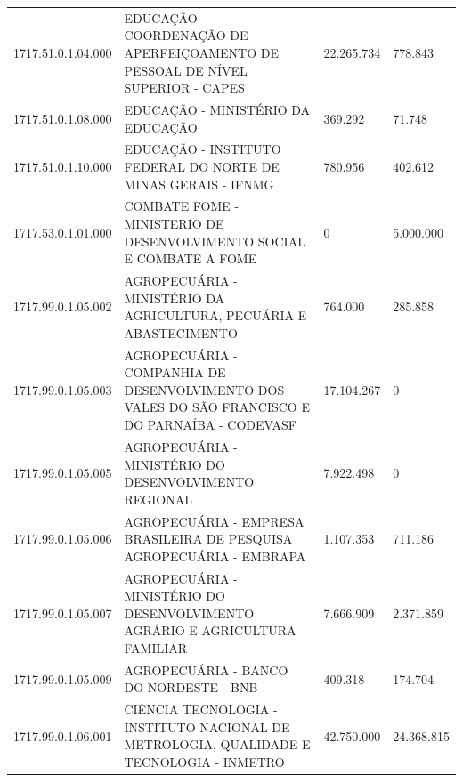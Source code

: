 \documentclass{article}
\begin{document}
\begin{longtable}[c]{m{2cm}|m{11cm}|m{2cm}m{2cm}}
\multicolumn{1}{C{2cm}|}{1717.51.0.1.04.000} & \multicolumn{1}{L{11cm}|}{EDUCAÇÃO - COORDENAÇÃO DE APERFEIÇOAMENTO DE PESSOAL DE NÍVEL SUPERIOR - CAPES} & \multicolumn{1}{R{2cm}|}{22.265.734} & \multicolumn{1}{R{2cm}}{778.843} \\
\multicolumn{1}{C{2cm}|}{1717.51.0.1.08.000} & \multicolumn{1}{L{11cm}|}{EDUCAÇÃO - MINISTÉRIO DA EDUCAÇÃO} & \multicolumn{1}{R{2cm}|}{369.292} & \multicolumn{1}{R{2cm}}{71.748} \\
\multicolumn{1}{C{2cm}|}{1717.51.0.1.10.000} & \multicolumn{1}{L{11cm}|}{EDUCAÇÃO - INSTITUTO FEDERAL DO NORTE DE MINAS GERAIS - IFNMG} & \multicolumn{1}{R{2cm}|}{780.956} & \multicolumn{1}{R{2cm}}{402.612} \\
\multicolumn{1}{C{2cm}|}{1717.53.0.1.01.000} & \multicolumn{1}{L{11cm}|}{COMBATE FOME - MINISTERIO DE DESENVOLVIMENTO SOCIAL E COMBATE A FOME} & \multicolumn{1}{R{2cm}|}{            0} & \multicolumn{1}{R{2cm}}{5.000.000} \\
\multicolumn{1}{C{2cm}|}{1717.99.0.1.05.002} & \multicolumn{1}{L{11cm}|}{AGROPECUÁRIA - MINISTÉRIO DA AGRICULTURA, PECUÁRIA E ABASTECIMENTO} & \multicolumn{1}{R{2cm}|}{764.000} & \multicolumn{1}{R{2cm}}{285.858} \\
\multicolumn{1}{C{2cm}|}{1717.99.0.1.05.003} & \multicolumn{1}{L{11cm}|}{AGROPECUÁRIA - COMPANHIA DE DESENVOLVIMENTO DOS VALES DO SÃO FRANCISCO E DO PARNAÍBA - CODEVASF} & \multicolumn{1}{R{2cm}|}{17.104.267} & \multicolumn{1}{R{2cm}}{            0} \\
\multicolumn{1}{C{2cm}|}{1717.99.0.1.05.005} & \multicolumn{1}{L{11cm}|}{AGROPECUÁRIA - MINISTÉRIO DO DESENVOLVIMENTO REGIONAL} & \multicolumn{1}{R{2cm}|}{7.922.498} & \multicolumn{1}{R{2cm}}{            0} \\
\multicolumn{1}{C{2cm}|}{1717.99.0.1.05.006} & \multicolumn{1}{L{11cm}|}{AGROPECUÁRIA - EMPRESA BRASILEIRA DE PESQUISA AGROPECUÁRIA - EMBRAPA} & \multicolumn{1}{R{2cm}|}{1.107.353} & \multicolumn{1}{R{2cm}}{711.186} \\
\multicolumn{1}{C{2cm}|}{1717.99.0.1.05.007} & \multicolumn{1}{L{11cm}|}{AGROPECUÁRIA - MINISTÉRIO DO DESENVOLVIMENTO AGRÁRIO E AGRICULTURA FAMILIAR} & \multicolumn{1}{R{2cm}|}{7.666.909} & \multicolumn{1}{R{2cm}}{2.371.859} \\
\multicolumn{1}{C{2cm}|}{1717.99.0.1.05.009} & \multicolumn{1}{L{11cm}|}{AGROPECUÁRIA - BANCO DO NORDESTE - BNB} & \multicolumn{1}{R{2cm}|}{409.318} & \multicolumn{1}{R{2cm}}{174.704} \\
\multicolumn{1}{C{2cm}|}{1717.99.0.1.06.001} & \multicolumn{1}{L{11cm}|}{CIÊNCIA TECNOLOGIA - INSTITUTO NACIONAL DE METROLOGIA, QUALIDADE E TECNOLOGIA - INMETRO} & \multicolumn{1}{R{2cm}|}{42.750.000} & \multicolumn{1}{R{2cm}}{24.368.815} \\

\end{longtable}
\end{document}
